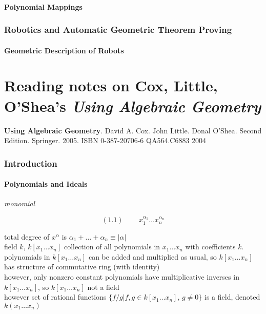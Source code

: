 \documentclass[10pt]{amsart}
\begin{document}
\begin{multicols*}{2}
\subsection{Polynomial Mappings }


\section{Robotics and Automatic Geometric Theorem Proving}



\subsection{Geometric Description of Robots}






\part{Reading notes on Cox, Little, O'Shea's \emph{Using Algebraic Geometry}}

\textbf{Using Algebraic Geometry}.  David A. Cox.  John Little. Donal O'Shea. Second Edition.  Springer.  2005.  ISBN 0-387-20706-6 QA564.C6883 2004

\section{ Introduction }

\subsection{ Polynomials and Ideals }

\emph{monomial } 

\begin{equation}
  (1.1) \quad \quad \, x_1^{\alpha_1} \dots x_n^{\alpha_n}
\end{equation}

total degree of $x^{\alpha}$ is $\alpha_1 + \dots + \alpha_n \equiv |\alpha|$ \\



field $k$, $k[x_1 \dots x_n]$ collection of all polynomials in $x_1 \dots x_n$ with coefficients $k$.   \\

polynomials in $k[x_1 \dots x_n]$ can be added and multiplied as usual, so $k[x_1 \dots x_n]$ has structure of commutative ring (with identity) \\
however, only nonzero constant polynomials have multiplicative inverses in $k[x_1 \dots x_n]$, so $k[x_1 \dots x_n]$ not a field \\
\quad however set of rational functions $\lbrace f/g | f,g \in k[x_1 \dots x_n], \, g\neq 0\rbrace$ is a field, denoted $k(x_1 \dots x_n)$ \\


\end{multicols*}
\end{document}
